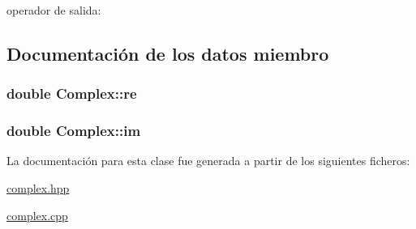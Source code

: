 operador de salida: 



\subsection{Documentación de los datos miembro}
\hypertarget{classComplex_843ce2f85af4c57db9063c86f3cd9607}{
\subsubsection{\setlength{\rightskip}{0pt plus 5cm}double {\bf Complex::re}}}
\label{classComplex_843ce2f85af4c57db9063c86f3cd9607}


\hypertarget{classComplex_776d595d5a1b576e9136cbc6bac0589c}{
\subsubsection{\setlength{\rightskip}{0pt plus 5cm}double {\bf Complex::im}}}
\label{classComplex_776d595d5a1b576e9136cbc6bac0589c}




La documentación para esta clase fue generada a partir de los siguientes ficheros:\begin{CompactItemize}
\item 
\hyperlink{complex_8hpp}{complex.hpp}\item 
\hyperlink{complex_8cpp}{complex.cpp}\end{CompactItemize}
